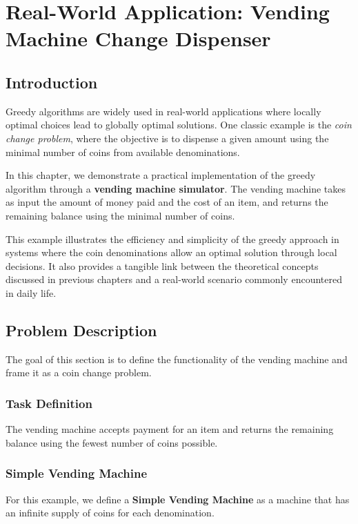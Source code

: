 \documentclass[12pt,a4paper]{report}
\begin{document}

\chapter{Real-World Application: Vending Machine Change Dispenser}
\section{Introduction}
Greedy algorithms are widely used in real-world applications where locally optimal choices lead to globally optimal solutions. One classic example is the \textit{coin change problem}, where the objective is to dispense a given amount using the minimal number of coins from available denominations.  

In this chapter, we demonstrate a practical implementation of the greedy algorithm through a \textbf{vending machine simulator}. The vending machine takes as input the amount of money paid and the cost of an item, and returns the remaining balance using the minimal number of coins.  

This example illustrates the efficiency and simplicity of the greedy approach in systems where the coin denominations allow an optimal solution through local decisions. It also provides a tangible link between the theoretical concepts discussed in previous chapters and a real-world scenario commonly encountered in daily life.

\section{Problem Description}
The goal of this section is to define the functionality of the vending machine and frame it as a coin change problem.  

\subsection{Task Definition}
The vending machine accepts payment for an item and returns the remaining balance using the fewest number of coins possible. 

\subsection{Simple Vending Machine}
For this example, we define a \textbf{Simple Vending Machine} as a machine that has an infinite supply of coins for each denomination.  
\end{document}
